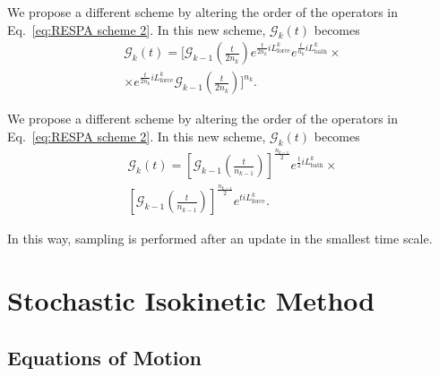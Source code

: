 \documentclass[
    journal=jctcce,
    layout=twocolumn
]{achemso}
\newcommand{\Liu}{i\!L}
\begin{document}
We propose a different scheme by altering the order of the operators in Eq.~\eqref{eq:RESPA scheme 2}.
In this new scheme, $\mathcal{G}_k(t)$ becomes
\begin{multline}
\label{eq:RESPA scheme 2}
\mathcal{G}_k(t) = \Big[\mathcal{G}_{k-1}\left(\tfrac{t}{2n_k}\right)
e^{\frac{t}{2 n_k} \Liu_\mathrm{force}^k}
e^{\frac{t}{n_k} \Liu_\mathrm{bath}^k}
\times \\
\times e^{\frac{t}{2 n_k} \Liu_\mathrm{force}^k}
\mathcal{G}_{k-1}\left(\tfrac{t}{2n_k}\right)
\Big]^{n_k}.
\end{multline}

We propose a different scheme by altering the order of the operators in Eq.~\eqref{eq:RESPA scheme 2}.
In this new scheme, $\mathcal{G}_k(t)$ becomes
\begin{multline}
\label{eq:RESPA new scheme}
\mathcal{G}_k(t) = 
\left[\mathcal{G}_{k-1}\left(\tfrac{t}{n_{k-1}}\right)\right]^\frac{n_{k-1}}{2}
e^{\frac{t}{2} \Liu_\mathrm{bath}^k} \times \\
\left[\mathcal{G}_{k-1}\left(\tfrac{t}{n_{k-1}}\right)\right]^\frac{n_{k-1}}{2}
e^{t \Liu_\mathrm{force}^k}.
\end{multline}

In this way, sampling is performed after an update in the smallest time scale.

\section{Stochastic Isokinetic Method}

\subsection{Equations of Motion}
\end{document}
